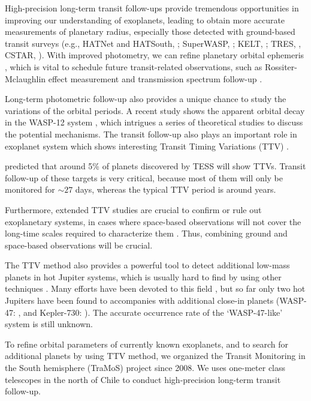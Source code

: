 High-precision long-term transit follow-ups provide tremendous opportunities in improving our understanding of exoplanets, leading to obtain more accurate measurements of planetary radius, especially those detected with ground-based transit surveys (e.g., HATNet and HATSouth, \citealt{Bakos2012}; SuperWASP, \citealt{Pollacco2006}; KELT, \citealt{Pepper2007}; TRES, \citealt{Alonso2007}, CSTAR, \citealt{WangS2014}). With improved photometry, we can refine planetary orbital ephemeris \citep{TEMP1}, which is vital to schedule future transit-related observations, such as Rossiter-Mclaughlin effect measurement \citep{Nutzman2011,Sanchis2011,Sanchis2013,WangS2018} and transmission spectrum follow-up \citep{Mancini2016b,Mackebrandt2017}.

Long-term photometric follow-up also provides a unique chance to study the variations of the orbital periods. A recent study shows the apparent orbital decay in the WASP-12 system \citep{Patra2017}, which intrigues a series of theoretical studies \citep{Millholland2018,Weinberg2017} to discuss the potential mechanisms. The transit follow-up also plays an important role in exoplanet system which shows interesting Transit Timing Variations (TTV) \citep{Ballard2011,Ford2012a,Steffen2012,Fabrycky2012,Mancini2016,WangS2017,Wu2018}. 

\cite{Ballard2018} predicted that around 5\% of planets discovered by TESS \citep{Ricker2014} will show TTVs. Transit follow-up of these targets is very critical, because most of them will only be monitored for $\sim27$ days, whereas the typical TTV period is around years. 

Furthermore, extended TTV studies are crucial to confirm or rule out exoplanetary systems, in cases where space-based observations will not cover the long-time scales required to characterize them \citep{vonEssen2018}. Thus, combining ground and space-based observations will be crucial. 

The TTV method \citep{Miralda2002,Agol2005,Holman2005}  also provides a powerful tool to detect additional low-mass planets in hot Jupiter systems, which is usually hard to find by using other techniques \citep{Steffen2012b}. Many efforts have been devoted to this field \citep{Pal2011,Hoyer2012,Hoyer2013,Szabo2013}, but so far only two hot Jupiters have been found to accompanies with additional close-in planets (WASP-47: \cite{Becker2015}, and Kepler-730: \cite{Canas2019}). The accurate occurrence rate of the `WASP-47-like' system is still unknown.

To refine orbital parameters of currently known exoplanets, and to search for additional planets by using TTV method, we organized the Transit Monitoring in the South hemisphere (TraMoS) project \citep{Hoyer2011} since 2008. We uses one-meter class telescopes in the north of Chile to conduct high-precision long-term transit follow-up. 

